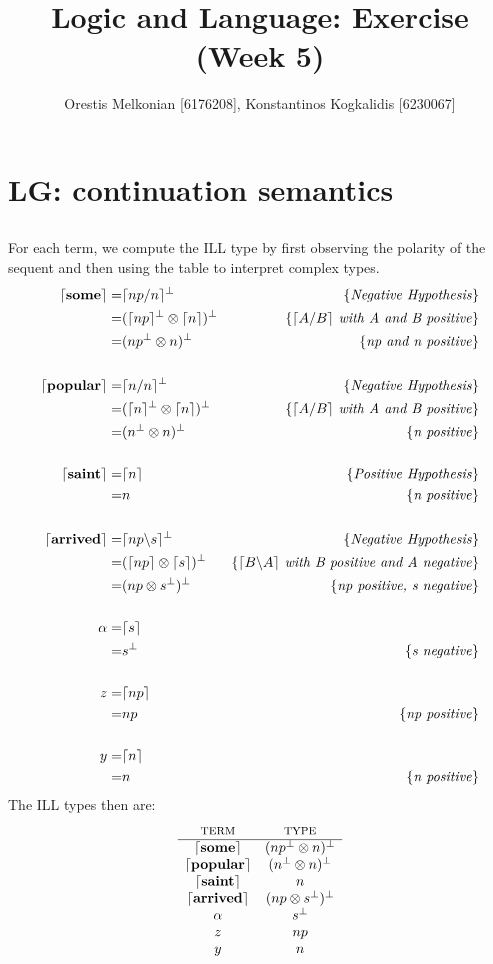 \documentclass[]{article}
\title{\textbf{Logic and Language: Exercise (Week 5)}}
\author{Orestis Melkonian [6176208], Konstantinos Kogkalidis [6230067]}
\date{}
\newcommand{\bs}{\backslash}
\newcommand{\tsc}{\textsc}
\newcommand{\ceil}[1]{\lceil #1 \rceil}
\newcommand{\w}[1]{\ceil{\mathbf{#1}}}
\newcommand{\note}[1]{\{\text{\textit{#1}}\}}
\begin{document}
\maketitle
\section{LG: continuation semantics}
\subsection{}
For each term, we compute the ILL type by first observing the polarity of the sequent and then using the table to interpret complex types.
\begin{align*}
\w{some}
=& \ceil{np/n}^\bot &\note{Negative Hypothesis} \\
=& (\ceil{np}^\bot \otimes \ceil{n})^\bot &\note{$\ceil{A/B}$ with A and B positive} \\
=& (np^\bot \otimes n)^\bot &\note{np and n positive} \\
\\
\w{popular}
=& \ceil{n/n}^\bot &\note{Negative Hypothesis}\\
=& (\ceil{n}^\bot \otimes \ceil{n})^\bot &\note{$\ceil{A/B}$ with A and B positive}\\
=& (n^\bot \otimes n)^\bot &\note{n positive}\\
\\
\w{saint}
=& \ceil{n} &\note{Positive Hypothesis}\\
=& n &\note{n positive}\\
\\
\w{arrived}
=& \ceil{np \bs s}^\bot &\note{Negative Hypothesis} \\
=& (\ceil{np} \otimes \ceil{s})^\bot &\note{$\ceil{B \bs A}$ with B positive and A negative}\\
=& (np \otimes s^\bot)^\bot &\note{np positive, s negative}\\
\\
\alpha
=& \ceil{s} \\
=& s^\bot &\note{s negative}\\
\\
z
=& \ceil{np} \\
=& np &\note{np positive}\\
\\
y
=& \ceil{n}\\
=& n &\note{n positive}\\
\end{align*}
The ILL types then are:
\[\begin{array}{cc}
\tsc{term} & \tsc{type}\\
\hline
\w{some} & (np^\bot \otimes n)^\bot \\
\w{popular} & (n^\bot \otimes n)^\bot \\
\w{saint} & n \\
\w{arrived} &  (np \otimes s^\bot)^\bot \\
\alpha & s^\bot \\
z & np \\
y & n \\
\end{array}\]
\end{document}
